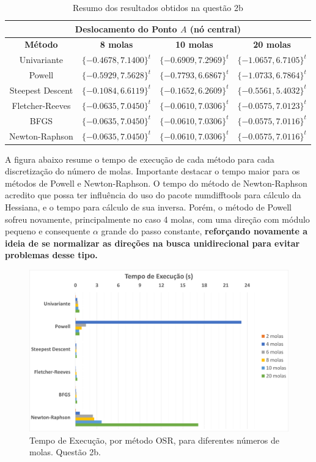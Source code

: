 \documentclass[10pt, a4paper]{article}
\begin{document}
\begin{table}[H]
  \begin{center}
    \begin{tabular}{c|c|c|c}
      \multicolumn{4}{c}{Deslocamento do Ponto $A$ (nó central)}\\
      \hline
      \textbf{Método}   & \textbf{8 molas} & \textbf{10 molas} & \textbf{20 molas} \\
      \hline
      Univariante       & $\{-0.4678, 7.1400\}^t$	& $\{-0.6909, 7.2969\}^t$ &	$\{-1.0657, 6.7105\}^t$ \\
      Powell	          & $\{-0.5929, 7.5628\}^t$	& $\{-0.7793, 6.6867\}^t$ &	$\{-1.0733, 6.7864\}^t$ \\
      Steepest Descent  & $\{-0.1084, 6.6119\}^t$	& $\{-0.1652, 6.2609\}^t$ &	$\{-0.5561, 5.4032\}^t$ \\
      Fletcher-Reeves   & $\{-0.0635, 7.0450\}^t$	& $\{-0.0610, 7.0306\}^t$ &	$\{-0.0575, 7.0123\}^t$ \\
      BFGS	            & $\{-0.0635, 7.0450\}^t$	& $\{-0.0610, 7.0306\}^t$ &	$\{-0.0575, 7.0116\}^t$ \\
      Newton-Raphson    & $\{-0.0635, 7.0450\}^t$	& $\{-0.0610, 7.0306\}^t$ &	$\{-0.0575, 7.0116\}^t$
    \end{tabular}
  \end{center}
  \caption{Resumo dos resultados obtidos na questão 2b}
\end{table}

A figura abaixo resume o tempo de execução de cada método para cada discretização do número de molas.
Importante destacar o tempo maior para os métodos de Powell e Newton-Raphson. O tempo do método de Newton-Raphson 
acredito que possa ter influência do uso do pacote numdifftools para cálculo da Hessiana, e o tempo para cálculo de sua inversa.
Porém, o método de Powell sofreu novamente, principalmente no caso 4 molas, com uma direção com módulo pequeno e
consequente $\alpha$ grande do passo constante, \textbf{reforçando novamente a ideia de se normalizar as direções na busca unidirecional
 para evitar problemas desse tipo.}

\begin{figure}[H]
  \centering
  \includegraphics[scale=0.4]{figuras/q2b_tempo.png}
  \caption{Tempo de Execução, por método OSR, para diferentes números de molas. Questão 2b.}
\end{figure}
\end{document}
